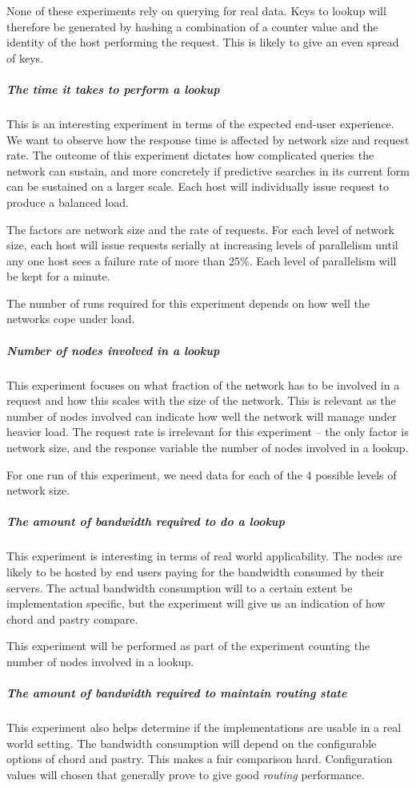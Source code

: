 None of these experiments rely on querying for real data. Keys to lookup will therefore be generated by hashing a combination of a counter value and the identity of the host performing the request. This is likely to give an even spread of keys.

\subparagraph{The time it takes to perform a lookup}
This is an interesting experiment in terms of the expected end-user experience. We want to observe how the response time is affected by network size and request rate. The outcome of this experiment dictates how complicated queries the network can sustain, and more concretely if predictive searches in its current form can be sustained on a larger scale. Each host will individually issue request to produce a balanced load.

The factors are network size and the rate of requests. 
For each level of network size, each host will issue requests serially at increasing levels of parallelism until any one host sees a failure rate of more than 25\%. Each level of parallelism will be kept for a minute.

The number of runs required for this experiment depends on how well the networks cope under load.

\subparagraph{Number of nodes involved in a lookup}
This experiment focuses on what fraction of the network has to be involved in a request and how this scales with the size of the network. This is relevant as the number of nodes involved can indicate how well the network will manage under heavier load.
The request rate is irrelevant for this experiment -- the only factor is network size, and the response variable the number of nodes involved in a lookup.

For one run of this experiment, we need data for each of the 4 possible levels of network size.

\subparagraph{The amount of bandwidth required to do a lookup}
This experiment is interesting in terms of real world applicability. The nodes are likely to be hosted by end users paying for the bandwidth consumed by their servers. The actual bandwidth consumption will to a certain extent be implementation specific, but the experiment will give us an indication of how chord and pastry compare.

This experiment will be performed as part of the experiment counting the number of nodes involved in a lookup.

\subparagraph{The amount of bandwidth required to maintain routing state}
This experiment also helps determine if the implementations are usable in a real world setting.
The bandwidth consumption will depend on the configurable options of chord and pastry. This makes a fair comparison hard. Configuration values will chosen that generally prove to give good \textit{routing} performance.

